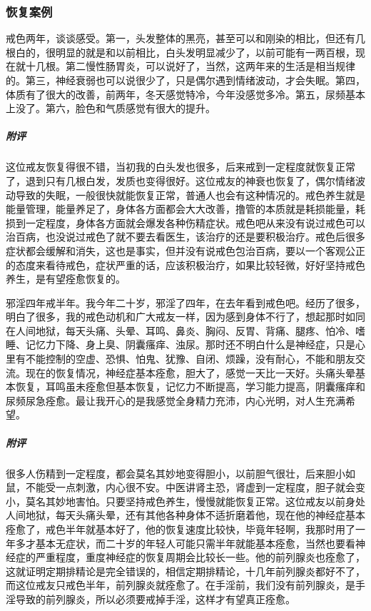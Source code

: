 \subsubsection{恢复案例}

\begin{case}[神经衰弱]
    戒色两年，谈谈感受。第一，头发整体的黑亮，甚至可以和刚染的相比，但还有几根白的，很明显的就是和以前相比，白头发明显减少了，以前可能有一两百根，现在就十几根。第二慢性肠胃炎，可以说好了，当然，这两年来的生活是相当规律的。第三，神经衰弱也可以说很少了，只是偶尔遇到情绪波动，才会失眠。第四，体质有了很大的改善，前两年，冬天感觉特冷，今年没感觉多冷。第五，尿频基本上没了。第六，脸色和气质感觉有很大的提升。
    \subparagraph{附评} 这位戒友恢复得很不错，当初我的白头发也很多，后来戒到一定程度就恢复正常了，退到只有几根白发，发质也变得很好。这位戒友的神衰也恢复了，偶尔情绪波动导致的失眠，一般很快就能恢复正常，普通人也会有这种情况的。戒色养生就是能量管理，能量养足了，身体各方面都会大大改善，撸管的本质就是耗损能量，耗损到一定程度，身体各方面就会爆发各种伤精症状。戒色吧从来没有说过戒色可以治百病，也没说过戒色了就不要去看医生，该治疗的还是要积极治疗。戒色后很多症状都会缓解和消失，这也是事实，但并没有说戒色包治百病，要以一个客观公正的态度来看待戒色，症状严重的话，应该积极治疗，如果比较轻微，好好坚持戒色养生，是有望痊愈恢复的。
\end{case}

\begin{case}[神经衰弱]
    邪淫四年戒半年。我今年二十岁，邪淫了四年，在去年看到戒色吧。经历了很多，明白了很多，我的戒色动机和广大戒友一样，因为感到身体不行了，想起那时如同在人间地狱，每天头痛、头晕、耳鸣、鼻炎、胸闷、反胃、背痛、腿疼、怕冷、嗜睡、记忆力下降、身上臭、阴囊瘙痒、浊尿。那时还不明白什么是神经症，只是心里有不能控制的空虚、恐惧、怕鬼、犹豫、自闭、烦躁，没有耐心，不能和朋友交流。现在的恢复情况，神经症基本痊愈，胆大了，感觉一天比一天好。头痛头晕基本恢复，耳鸣虽未痊愈但基本恢复，记忆力不断提高，学习能力提高，阴囊瘙痒和尿频尿急痊愈。最让我开心的是我感觉全身精力充沛，内心光明，对人生充满希望。
    \subparagraph{附评} 很多人伤精到一定程度，都会莫名其妙地变得胆小，以前胆气很壮，后来胆小如鼠，不能受一点刺激，内心很不安。中医讲肾主恐，肾虚到一定程度，胆子就会变小，莫名其妙地害怕。只要坚持戒色养生，慢慢就能恢复正常。这位戒友以前身处人间地狱，每天头痛头晕，还有其他各种身体不适折磨着他，现在他的神经症基本痊愈了，戒色半年就基本好了，他的恢复速度比较快，毕竟年轻啊，我那时用了一年多才基本无症状，而二十岁的年轻人可能只需半年就能基本痊愈，当然也要看神经症的严重程度，重度神经症的恢复周期会比较长一些。他的前列腺炎也痊愈了，这就证明定期排精论是完全错误的，相信定期排精论，十几年前列腺炎都好不了，而这位戒友只戒色半年，前列腺炎就痊愈了。在手淫前，我们没有前列腺炎，是手淫导致的前列腺炎，所以必须要戒掉手淫，这样才有望真正痊愈。
\end{case}

